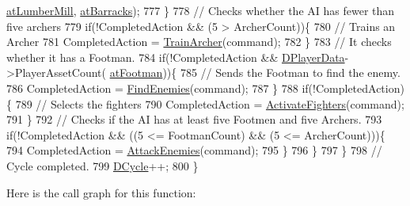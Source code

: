 \begin{DoxyCode}
      \hyperlink{GameDataTypes_8h_a5600d4fc433b83300308921974477feca7bb38316bc3193b5c9ec67ea6aad549c}{atLumberMill}, \hyperlink{GameDataTypes_8h_a5600d4fc433b83300308921974477feca1cbf6c944f30d615a247eef1f57b2230}{atBarracks});
777             \}
778             \textcolor{comment}{// Checks whether the AI has fewer than five archers}
779             \textcolor{keywordflow}{if}(!CompletedAction &&  (5 > ArcherCount))\{
780                 \textcolor{comment}{// Trains an Archer}
781                 CompletedAction = \hyperlink{classCAIPlayer_af2edf1e3c54d6af693f768f86d484fd6}{TrainArcher}(command);
782             \}
783             \textcolor{comment}{// It checks whether it has a Footman.}
784             \textcolor{keywordflow}{if}(!CompletedAction && \hyperlink{classCAIPlayer_a83b5113c8f7e80df54940b647c5ee2e6}{DPlayerData}->PlayerAssetCount(
      \hyperlink{GameDataTypes_8h_a5600d4fc433b83300308921974477fecad586e8ff9ee846d22630c2066e8fb7c2}{atFootman}))\{
785                 \textcolor{comment}{// Sends the Footman to find the enemy.}
786                 CompletedAction = \hyperlink{classCAIPlayer_a33b1533570e7a00114d1b85b3551e395}{FindEnemies}(command);
787             \}
788             \textcolor{keywordflow}{if}(!CompletedAction)\{
789                 \textcolor{comment}{// Selects the fighters}
790                 CompletedAction = \hyperlink{classCAIPlayer_a4216d7e76315234a4fe22fb3a0a89c1d}{ActivateFighters}(command);
791             \}
792             \textcolor{comment}{// Checks if the AI has at least five Footmen and five Archers.}
793             \textcolor{keywordflow}{if}(!CompletedAction && ((5 <= FootmanCount) && (5 <= ArcherCount)))\{
794                 CompletedAction = \hyperlink{classCAIPlayer_adf7feeba7debf9f19b000887616d7bfb}{AttackEnemies}(command);
795             \}
796         \}
797     \}
798     \textcolor{comment}{// Cycle completed.}
799     \hyperlink{classCAIPlayer_adf12a7afe7ea86410b18eff47fa95253}{DCycle}++;
800 \}
\end{DoxyCode}
Here is the call graph for this function\+:\nopagebreak

